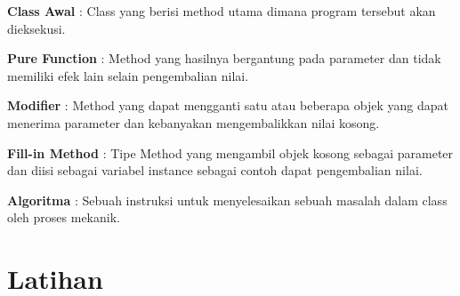 \textbullet \textbf{Class Awal} : Class yang berisi method utama dimana program tersebut akan dieksekusi. \newline

\textbullet \textbf{Pure Function} : Method yang hasilnya bergantung pada parameter dan tidak memiliki efek lain selain pengembalian nilai. \newline

\textbullet \textbf{Modifier} : Method yang dapat mengganti satu atau beberapa objek yang dapat menerima parameter dan kebanyakan mengembalikkan nilai kosong. \newline

\textbullet \textbf{Fill-in Method} : Tipe Method yang mengambil objek kosong sebagai parameter dan diisi sebagai variabel instance sebagai contoh dapat pengembalian nilai. \newline

\textbullet \textbf{Algoritma} : Sebuah instruksi untuk menyelesaikan sebuah masalah dalam class oleh proses mekanik. \newline


\section{Latihan}


